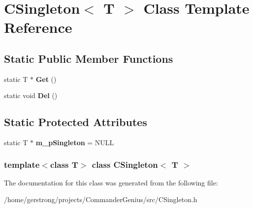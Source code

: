 \hypertarget{class_c_singleton}{
\section{CSingleton$<$ T $>$ Class Template Reference}
\label{class_c_singleton}
}
\subsection*{Static Public Member Functions}
\begin{DoxyCompactItemize}
\item 
\hypertarget{class_c_singleton_addfd6206ca1215f8394d73c71dfe40a8}{
static T $\ast$ {\bfseries Get} ()}
\label{class_c_singleton_addfd6206ca1215f8394d73c71dfe40a8}

\item 
\hypertarget{class_c_singleton_a607c30467bbc7fec4ea0e6c2769a9472}{
static void {\bfseries Del} ()}
\label{class_c_singleton_a607c30467bbc7fec4ea0e6c2769a9472}

\end{DoxyCompactItemize}
\subsection*{Static Protected Attributes}
\begin{DoxyCompactItemize}
\item 
\hypertarget{class_c_singleton_a12ee2d768ca09bac85c2d6d550da4f54}{
static T $\ast$ {\bfseries m\_\-pSingleton} = NULL}
\label{class_c_singleton_a12ee2d768ca09bac85c2d6d550da4f54}

\end{DoxyCompactItemize}
\subsubsection*{template$<$class T$>$ class CSingleton$<$ T $>$}



The documentation for this class was generated from the following file:\begin{DoxyCompactItemize}
\item 
/home/gerstrong/projects/CommanderGenius/src/CSingleton.h\end{DoxyCompactItemize}
